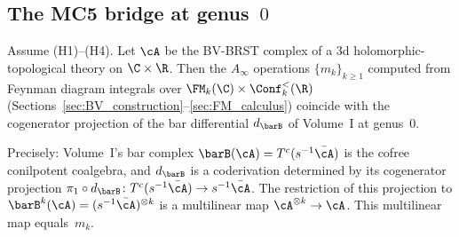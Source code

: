 \subsection{The MC5 bridge at genus~$0$}

\begin{theorem}[Feynman $m_k$ = bar differential at genus~$0$;
\ClaimStatusProvedHere]
Assume \textrm{(H1)--(H4)}. Let $\cA$ be the BV-BRST complex of
a 3d holomorphic-topological theory on $\C \times \R$. Then the
$A_\infty$ operations $\{m_k\}_{k \geq 1}$ computed from Feynman
diagram integrals over $\FM_k(\C) \times \Conf_k^{<}(\R)$
(Sections~\ref{sec:BV_construction}--\ref{sec:FM_calculus})
coincide with the cogenerator projection of the bar differential
$d_{\barB}$ of Volume~I at genus~$0$.

Precisely: Volume~I's bar complex
$\barB(\cA) = T^c(s^{-1}\bar{\cA})$ is the cofree conilpotent
coalgebra, and $d_{\barB}$ is a coderivation determined by its
cogenerator projection
$\pi_1 \circ d_{\barB} \colon T^c(s^{-1}\bar{\cA}) \to
s^{-1}\bar{\cA}$. The restriction of this projection to
$\barB^k(\cA) = (s^{-1}\bar{\cA})^{\otimes k}$ is a multilinear
map $\cA^{\otimes k} \to \cA$. This multilinear map
equals~$m_k$.
\end{theorem}


